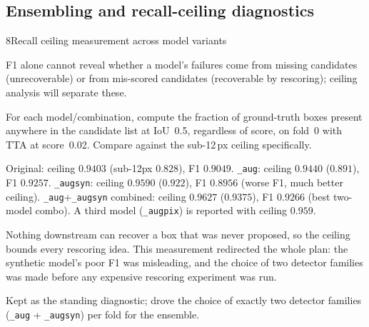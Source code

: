 \subsection{Ensembling and recall-ceiling diagnostics}
\begin{explog}{8}{Recall ceiling measurement across model variants}
\item[Hypothesis] F1 alone cannot reveal whether a model's failures come from missing candidates (unrecoverable) or from mis-scored candidates (recoverable by rescoring); ceiling analysis will separate these.
\item[Method] For each model/combination, compute the fraction of ground-truth boxes present anywhere in the candidate list at IoU~0.5, regardless of score, on fold~0 with TTA at score~0.02. Compare against the sub-12\,px ceiling specifically.
\item[Result] Original: ceiling $0.9403$ (sub-12px $0.828$), F1 $0.9049$. \texttt{\_aug}: ceiling $0.9440$ ($0.891$), F1 $0.9257$. \texttt{\_augsyn}: ceiling $0.9590$ ($0.922$), F1 $0.8956$ (worse F1, much better ceiling). \texttt{\_aug}+\texttt{\_augsyn} combined: ceiling $0.9627$ ($0.9375$), F1 $0.9266$ (best two-model combo). A third model (\texttt{\_augpix}) is reported with ceiling $0.959$.
\item[Inference] Nothing downstream can recover a box that was never proposed, so the ceiling bounds every rescoring idea. This measurement redirected the whole plan: the synthetic model's poor F1 was misleading, and the choice of two detector families was made before any expensive rescoring experiment was run.
\item[Verdict] Kept as the standing diagnostic; drove the choice of exactly two detector families (\texttt{\_aug} + \texttt{\_augsyn}) per fold for the ensemble.
\end{explog}


